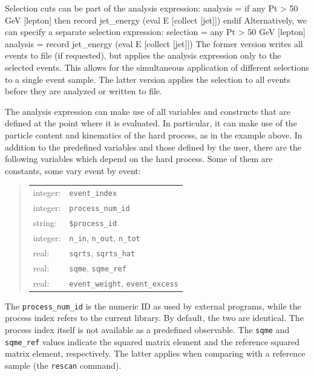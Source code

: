 \documentclass[12pt]{book}
\newenvironment{code}%
  {\begingroup\footnotesize
   \quote
   \Verbatim}%
  {\endVerbatim
   \endquote
   \endgroup\noindent}
\newcommand{\ttt}[1]{\texttt{#1}}
\begin{document}
Selection cuts can be part of the analysis expression:
\begin{code}
  analysis =
    if any Pt > 50 GeV [lepton] then
      record jet_energy (eval E [collect [jet]])
    endif
\end{code}
Alternatively, we can specify a separate selection expression:
\begin{code}
  selection = any Pt > 50 GeV [lepton]
  analysis = record jet_energy (eval E [collect [jet]])
\end{code}
The former version writes all events to file (if requested), but
applies the analysis expression only to the selected events.  This
allows for the simultaneous application of different selections to a
single event sample.  The latter version applies the selection to all
events before they are analyzed or written to file.

The analysis expression can make use of all variables and constructs that are
defined at the point where it is evaluated.  In particular, it can make use of
the particle content and kinematics of the hard process, as in the example
above.  In addition to the predefined variables and those defined by the user,
there are the following variables which depend on the hard process.  Some of
them are constants, some vary event by event:
\begin{quote}
\begin{tabular}{ll}
integer: &\ttt{event\_index} \\
integer: &\ttt{process\_num\_id} \\
string: &\ttt{\$process\_id} \\
integer: &\ttt{n\_in}, \ttt{n\_out}, \ttt{n\_tot} \\
real: &\ttt{sqrts}, \ttt{sqrts\_hat} \\
real: &\ttt{sqme}, \ttt{sqme\_ref} \\
real: &\ttt{event\_weight}, \ttt{event\_excess}
\end{tabular}
\end{quote}
The \ttt{process\_num\_id} is the numeric ID as used by external
programs, while the process index refers to the current library. By
default, the two are identical.  The process index itself is not
available as a predefined observable. The \ttt{sqme} and
\ttt{sqme\_ref} values indicate the squared matrix element and the
reference squared matrix element, respectively.  The latter applies
when comparing with a reference sample (the \ttt{rescan} command).
\end{document}
